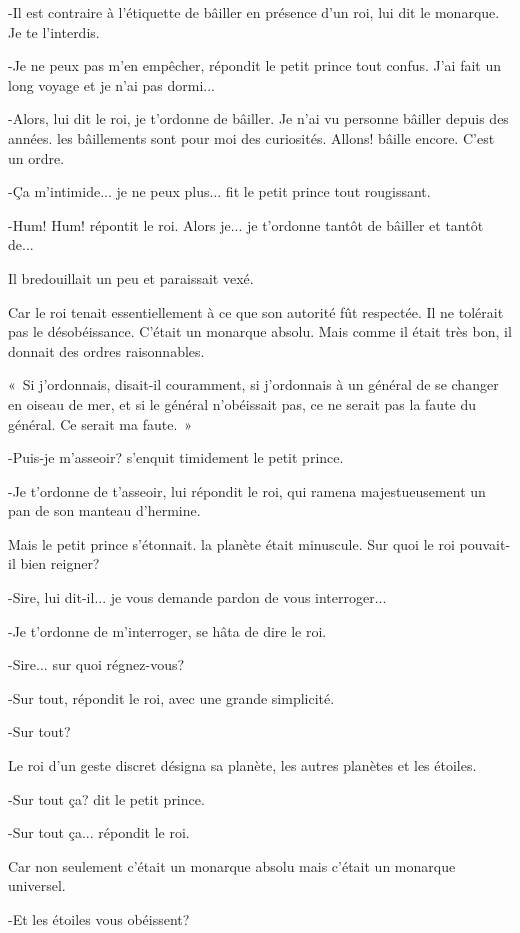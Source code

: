 \documentclass{report}
\begin{document}
-Il est contraire à l'étiquette de bâiller en présence d'un roi, lui dit le monarque. Je te l'interdis.

-Je ne peux pas m'en empêcher, répondit le petit prince tout confus. J'ai fait un long voyage et je n'ai pas dormi...

-Alors, lui dit le roi, je t'ordonne de bâiller. Je n'ai vu personne bâiller depuis des années. les bâillements sont pour moi des curiosités. Allons! bâille encore. C'est un ordre.

-Ça m'intimide... je ne peux plus... fit le petit prince tout rougissant.

-Hum! Hum! répontit le roi. Alors je... je t'ordonne tantôt de bâiller et tantôt de...

Il bredouillait un peu et paraissait vexé.

Car le roi tenait essentiellement à ce que son autorité fût respectée. Il ne tolérait pas le désobéissance. C'était un monarque absolu. Mais comme il était très bon, il donnait des ordres raisonnables.

«~Si j'ordonnais, disait-il couramment, si j'ordonnais à un général de se changer en oiseau de mer, et si le général n'obéissait pas, ce ne serait pas la faute du général. Ce serait ma faute.~»

-Puis-je m'asseoir? s'enquit timidement le petit prince.

-Je t'ordonne de t'asseoir, lui répondit le roi, qui ramena majestueusement un pan de son manteau d'hermine.

Mais le petit prince s'étonnait. la planète était minuscule. Sur quoi le roi pouvait-il bien reigner?

-Sire, lui dit-il... je vous demande pardon de vous interroger...

-Je t'ordonne de m'interroger, se hâta de dire le roi.

-Sire... sur quoi régnez-vous?

-Sur tout, répondit le roi, avec une grande simplicité.

-Sur tout?

Le roi d'un geste discret désigna sa planète, les autres planètes et les étoiles.

-Sur tout ça? dit le petit prince.

-Sur tout ça... répondit le roi.

Car non seulement c'était un monarque absolu mais c'était un monarque universel.

-Et les étoiles vous obéissent?
\end{document}
